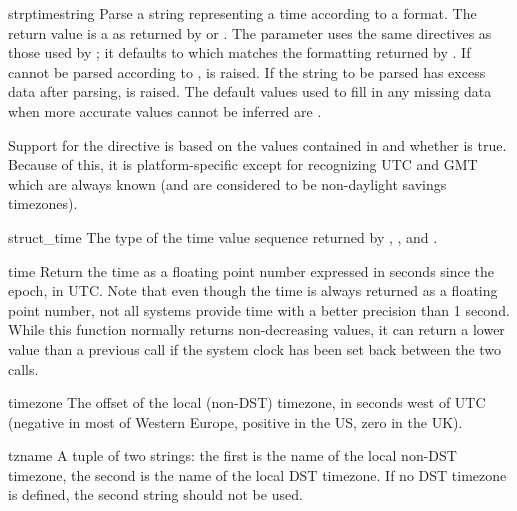 \begin{funcdesc}{strptime}{string}
Parse a string representing a time according to a format.  The return 
value is a  as returned by  or
.  The  parameter uses the same
directives as those used by ; it defaults to
 which matches the formatting
returned by .  If  cannot be parsed
according to ,  is raised.  If the
string to be parsed has excess data after parsing,
 is raised.  The default values used to fill in
any missing data when more accurate values cannot be inferred are
 .

Support for the  directive is based on the values contained in
 and whether  is true.  Because of this,
it is platform-specific except for recognizing UTC and GMT which are
always known (and are considered to be non-daylight savings
timezones).
\end{funcdesc}

\begin{datadesc}{struct_time}
The type of the time value sequence returned by ,
, and .
\end{datadesc}

\begin{funcdesc}{time}{}
Return the time as a floating point number expressed in seconds since
the epoch, in UTC.  Note that even though the time is always returned
as a floating point number, not all systems provide time with a better
precision than 1 second.  While this function normally returns
non-decreasing values, it can return a lower value than a previous
call if the system clock has been set back between the two calls.
\end{funcdesc}

\begin{datadesc}{timezone}
The offset of the local (non-DST) timezone, in seconds west of UTC
(negative in most of Western Europe, positive in the US, zero in the
UK).
\end{datadesc}

\begin{datadesc}{tzname}
A tuple of two strings: the first is the name of the local non-DST
timezone, the second is the name of the local DST timezone.  If no DST
timezone is defined, the second string should not be used.
\end{datadesc}

